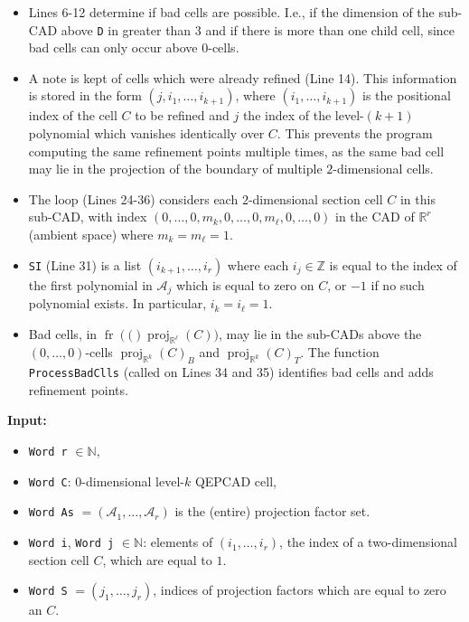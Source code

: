 \documentclass[
]{book}
\providecommand{\tightlist}{%
  \setlength{\itemsep}{0pt}\setlength{\parskip}{0pt}}
\theoremstyle{definition}
\theoremstyle{definition}
\theoremstyle{definition}
\theoremstyle{definition}
\theoremstyle{remark}
\begin{document}
\begin{itemize}
\tightlist
\item
  Lines 6-12 determine if bad cells are possible. I.e., if the dimension of the sub-CAD above \texttt{D} in greater than \(3\) and if there is more than one child cell, since bad cells can only occur above \(0\)-cells.
\item
  A note is kept of cells which were already refined (Line 14). This information is stored in the form \((j,i_1,\ldots,i_{k+1})\), where \((i_1,\ldots,i_{k+1})\) is the positional index of the cell \(C\) to be refined and \(j\) the index of the level-\((k+1)\) polynomial which vanishes identically over \(C\). This prevents the program computing the same refinement points multiple times, as the same bad cell may lie in the projection of the boundary of multiple \(2\)-dimensional cells.
\item
  The loop (Lines 24-36) considers each \(2\)-dimensional section cell \(C\) in this sub-CAD, with index \((0,\ldots,0,m_k,0,\ldots,0,m_\ell,0,\ldots,0)\) in the CAD of \(\mathbb{R}^r\) (ambient space) where \(m_k=m_\ell = 1\).
\item
  \texttt{SI} (Line 31) is a list \((i_{k+1},\ldots,i_r)\) where each \(i_j \in \mathbb{Z}\) is equal to the index of the first polynomial in \(\mathcal{A}_j\) which is equal to zero on \(C\), or \(-1\) if no such polynomial exists. In particular, \(i_k = i_\ell = 1\).
\item
  Bad cells, in \({\operatorname{fr} \left( ( \right)}{\operatorname{proj}_{\mathbb{R}^{\ell}}}(C))\), may lie in the sub-CADs above the \((0,\ldots,0)\)-cells \({\operatorname{proj}_{\mathbb{R}^{k}}}(C)_B\) and \({\operatorname{proj}_{\mathbb{R}^{k}}}(C)_T\). The function \texttt{ProcessBadClls} (called on Lines 34 and 35) identifies bad cells and adds refinement points.
\end{itemize}

\textbf{Input:}

\begin{itemize}
\tightlist
\item
  \texttt{Word\ r} \(\in \mathbb{N}\),
\item
  \texttt{Word\ C}: \(0\)-dimensional level-\(k\) QEPCAD cell,
\item
  \texttt{Word\ As} \(= (\mathcal{A}_1,\ldots,\mathcal{A}_r)\) is the (entire) projection factor set.
\item
  \texttt{Word\ i}, \texttt{Word\ j} \(\in \mathbb{N}\): elements of \((i_1,\ldots,i_r)\), the index of a two-dimensional section cell \(C\), which are equal to \(1\).
\item
  \texttt{Word\ S} \(= (j_1,\ldots,j_r)\), indices of projection factors which are equal to zero an \(C\).
\end{itemize}
\end{document}
